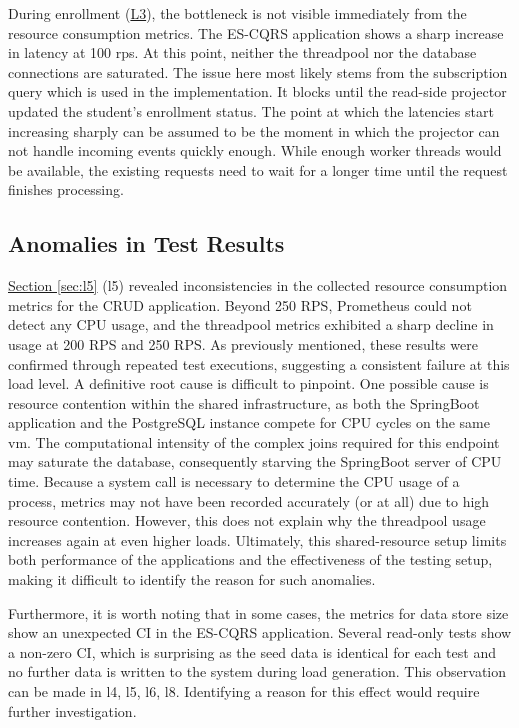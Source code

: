 During enrollment (\hyperref[sec:l3]{L3}), the bottleneck is not visible immediately from the resource consumption metrics. The ES-CQRS application shows a sharp increase in latency at 100 \gls{rps}. At this point, neither the threadpool nor the database connections are saturated. The issue here most likely stems from the subscription query which is used in the implementation. It blocks until the read-side projector updated the student's enrollment status. The point at which the latencies start increasing sharply can be assumed to be the moment in which the projector can not handle incoming events quickly enough. While enough worker threads would be available, the existing requests need to wait for a longer time until the request finishes processing.

\subsection{Anomalies in Test Results}
\label{sec:anomalies}

\hyperref[sec:l5]{Section \ref*{sec:l5}} (\gls{l}5) revealed inconsistencies in the collected resource consumption metrics for the CRUD application. Beyond 250 RPS, Prometheus could not detect any CPU usage, and the threadpool metrics exhibited a sharp decline in usage at 200 RPS and 250 RPS. As previously mentioned, these results were confirmed through repeated test executions, suggesting a consistent failure at this load level. A definitive root cause is difficult to pinpoint. One possible cause is resource contention within the shared infrastructure, as both the SpringBoot application and the PostgreSQL instance compete for CPU cycles on the same \gls{vm}. The computational intensity of the complex joins required for this endpoint may saturate the database, consequently starving the SpringBoot server of CPU time. Because a system call is necessary to determine the CPU usage of a process, metrics may not have been recorded accurately (or at all) due to high resource contention. However, this does not explain why the threadpool usage increases again at even higher loads. Ultimately, this shared-resource setup limits both performance of the applications and the effectiveness of the testing setup, making it difficult to identify the reason for such anomalies.

Furthermore, it is worth noting that in some cases, the metrics for data store size show an unexpected \gls{CI} in the ES-CQRS application. Several read-only tests show a non-zero \gls{CI}, which is surprising as the seed data is identical for each test and no further data is written to the system during load generation. This observation can be made in \gls{l}4, \gls{l}5, \gls{l}6, \gls{l}8. Identifying a reason for this effect would require further investigation.


